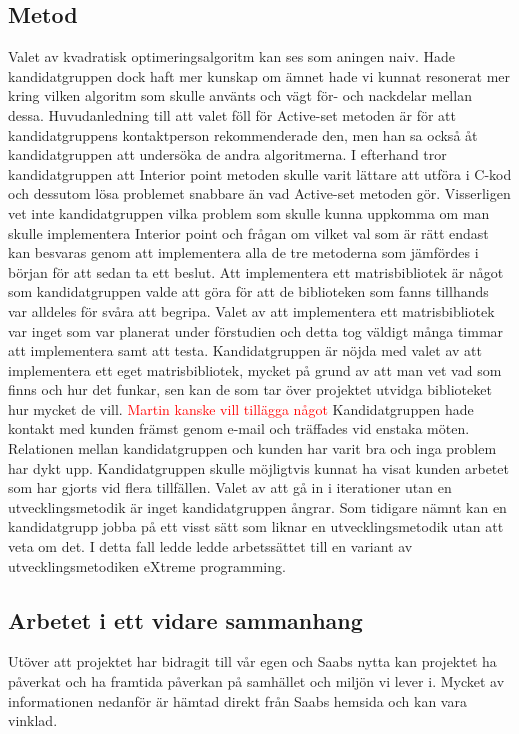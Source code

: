 \subsection{Metod}
Valet av kvadratisk optimeringsalgoritm kan ses som aningen naiv. Hade kandidatgruppen dock haft mer kunskap om ämnet hade vi kunnat resonerat mer kring vilken algoritm som skulle använts och vägt för- och nackdelar mellan dessa. Huvudanledning till att valet föll för Active-set metoden är för att kandidatgruppens kontaktperson rekommenderade den, men han sa också åt kandidatgruppen att undersöka de andra algoritmerna. I efterhand tror kandidatgruppen att Interior point metoden skulle varit lättare att utföra i C-kod och dessutom lösa problemet snabbare än vad Active-set metoden gör. Visserligen vet inte kandidatgruppen vilka problem som skulle kunna uppkomma om man skulle implementera Interior point och frågan om vilket val som är rätt endast kan besvaras genom att implementera alla de tre metoderna som jämfördes i början för att sedan ta ett beslut.
\newline
\newline
Att implementera ett matrisbibliotek är något som kandidatgruppen valde att göra för att de biblioteken som fanns tillhands var alldeles för svåra att begripa. Valet av att implementera ett matrisbibliotek var inget som var planerat under förstudien och detta tog väldigt många timmar att implementera samt att testa. Kandidatgruppen är nöjda med valet av att implementera ett eget matrisbibliotek, mycket på grund av att man vet vad som finns och hur det funkar, sen kan de som tar över projektet utvidga biblioteket hur mycket de vill. \textcolor{red}{Martin kanske vill tillägga något}
\newline
\newline
Kandidatgruppen hade kontakt med kunden främst genom e-mail och träffades vid enstaka möten. Relationen mellan kandidatgruppen och kunden har varit bra och inga problem har dykt upp. Kandidatgruppen skulle möjligtvis kunnat ha visat kunden arbetet som har gjorts vid flera tillfällen. 
\newline
\newline
Valet av att gå in i iterationer utan en utvecklingsmetodik är inget kandidatgruppen ångrar. Som tidigare nämnt kan en kandidatgrupp jobba på ett visst sätt som liknar en utvecklingsmetodik utan att veta om det. I detta fall ledde ledde arbetssättet till en variant av utvecklingsmetodiken eXtreme programming.

\subsection{Arbetet i ett vidare sammanhang}
Utöver att projektet har bidragit till vår egen och Saabs nytta kan projektet ha påverkat och ha framtida påverkan på samhället och miljön vi lever i. Mycket av informationen nedanför är hämtad direkt från Saabs hemsida och kan vara vinklad.   

